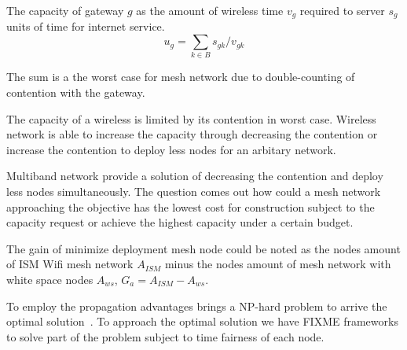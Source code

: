 The capacity of gateway $g$ as the amount of wireless time $v_g$ required to server $s_g$ units of time for internet service.
\begin{equation}
u_{g}=\sum_{k\in B} s_{gk}/v_{gk}
\end{equation}

The sum is a the worst case for mesh network due to double-counting of contention with the gateway.

The capacity of a wireless is limited by its contention in worst case. 
Wireless network is able to increase the capacity through decreasing the contention or increase the contention to deploy less nodes for an arbitary network. 

Multiband network provide a solution of decreasing the contention and deploy less nodes simultaneously. 
The question comes out how could a mesh network approaching the objective has the lowest cost for construction subject to the capacity request or achieve the highest capacity under a certain budget.



The gain of minimize deployment mesh node could be noted as the nodes amount of ISM Wifi mesh network $A_{ISM}$ minus the nodes amount of mesh network with white space nodes $A_{ws}$, $G_a=A_{ISM}-A_{ws}$.


To employ the propagation advantages brings a NP-hard problem to arrive the optimal solution~\cite{arkoulis2013optimal}. 
To approach the optimal solution we have FIXME frameworks to solve part of the problem subject to time fairness of each node.





